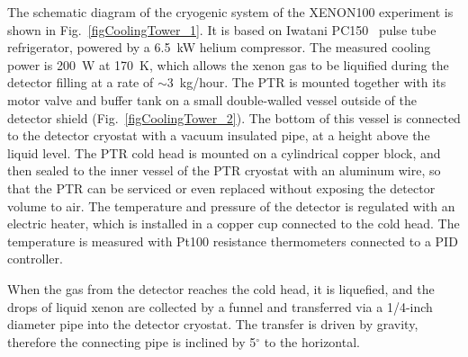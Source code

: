 The schematic diagram of the cryogenic system of the XENON100 experiment is shown in Fig.~\ref{figCoolingTower_1}. It is based on Iwatani PC150~\cite{PTR} pulse tube refrigerator, powered by a 6.5~kW helium compressor. The measured cooling power is 200~W at 170~K, which allows the xenon gas to be liquified during the detector filling at a rate of $\sim$3~kg/hour.  The PTR is mounted together with its motor valve and buffer tank on a small double-walled vessel outside of the detector shield (Fig.~\ref{figCoolingTower_2}). The bottom of this vessel is connected to the detector cryostat with a vacuum insulated pipe, at a height above the liquid level. 
The PTR cold head is mounted on a cylindrical copper block, and then sealed to the inner vessel of the PTR cryostat with an aluminum wire, so that the PTR can be serviced or even replaced without exposing the detector volume to air. The temperature and pressure of the detector is regulated with an electric heater, which is installed in a copper cup connected to the cold head. The temperature is measured with Pt100 resistance thermometers connected to a PID controller.

When the gas from the detector reaches the cold head, it is liquefied, and the drops of liquid xenon are collected by a funnel and transferred via a 1/4-inch diameter pipe into the detector cryostat. The transfer is driven by gravity, therefore the connecting pipe is inclined by 5$^{\circ}$ to the horizontal.

